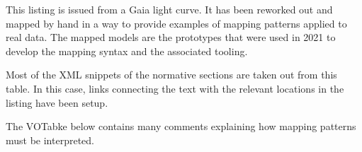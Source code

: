 This listing is issued from a Gaia light curve. It has been reworked out and mapped by hand 
in a way to provide examples of mapping patterns applied to real data.
The mapped models are the prototypes that were used in 2021 to develop the mapping syntax 
and the associated tooling.

Most of the XML snippets of the normative sections are taken out from this table. 
In this case, links connecting the text with the relevant locations in the listing have been setup.

The VOTabke below contains many comments explaining how mapping patterns must be interpreted.


